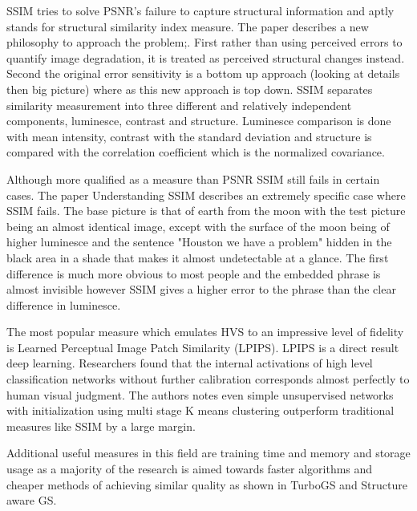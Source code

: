 \documentclass[10pt,twocolumn]{article}
\begin{document}
SSIM tries to solve PSNR's failure to capture structural information and aptly stands for structural similarity index measure. The paper describes a new philosophy to approach the problem;. First rather than using perceived errors to quantify image degradation, it is treated as perceived structural changes instead. Second the original error sensitivity is a bottom up approach (looking at details then big picture) where as this new approach is top down. SSIM separates similarity measurement into three different and relatively independent components, luminesce, contrast and structure. Luminesce comparison is done with mean intensity, contrast with the standard deviation and structure is compared with the correlation coefficient which is the normalized covariance\cite{1284395}. 

Although more qualified as a measure than PSNR SSIM still fails in certain cases. The paper Understanding SSIM describes an extremely specific case where SSIM fails. The base picture is that of earth from the moon with the test picture being an almost identical image, except with the surface of the moon being of higher luminesce and the sentence "Houston we have a problem" hidden in the black area in a shade that makes it almost undetectable at a glance. The first difference is much more obvious to most people and the embedded phrase is almost invisible however SSIM gives a higher error to the phrase than the clear difference in luminesce\cite{nilsson2020understandingssim}.

The most popular measure which emulates HVS to an impressive level of fidelity is Learned Perceptual Image Patch Similarity (LPIPS). LPIPS is a direct result deep learning. Researchers found that the internal activations of high level classification networks without further calibration corresponds almost perfectly to human visual judgment. The authors notes even simple unsupervised networks with initialization using multi stage K means clustering outperform traditional measures like SSIM by a large margin\cite{zhang2018unreasonableeffectivenessdeepfeatures}.

Additional useful measures in this field are training time and memory and storage usage as a majority of the research is aimed towards faster algorithms and cheaper methods of achieving similar quality as shown in TurboGS\cite{lu2024turbogsaccelerating3dgaussian} and Structure aware GS\cite{ververas2024sagsstructureaware3dgaussian}.
\end{document}

